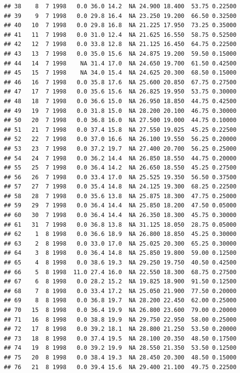 \documentclass[
]{book}
\begin{document}
\begin{verbatim}
## 38    8  7 1998   0.0 36.0 14.2  NA 24.900 18.400  53.75 0.22500
## 39    9  7 1998   0.0 29.8 16.4  NA 23.250 19.200  66.50 0.32500
## 40   10  7 1998   0.0 29.8 16.8  NA 21.225 17.950  73.25 0.35000
## 41   11  7 1998   0.0 31.0 12.4  NA 21.625 16.550  58.75 0.52500
## 42   12  7 1998   0.0 33.8 12.8  NA 21.125 16.450  64.75 0.22500
## 43   13  7 1998   0.0 35.0 15.6  NA 24.875 19.200  59.50 0.15000
## 44   14  7 1998    NA 31.4 17.0  NA 24.650 19.700  61.50 0.42500
## 45   15  7 1998    NA 34.0 15.4  NA 24.625 20.300  68.50 0.15000
## 46   16  7 1998   0.0 35.8 17.6  NA 25.600 20.850  67.75 0.27500
## 47   17  7 1998   0.0 35.6 15.6  NA 26.825 19.950  53.75 0.30000
## 48   18  7 1998   0.0 36.6 15.0  NA 26.950 18.850  44.75 0.42500
## 49   19  7 1998   0.0 31.8 15.0  NA 28.200 20.100  46.75 0.30000
## 50   20  7 1998   0.0 36.8 16.0  NA 27.500 19.000  44.75 0.10000
## 51   21  7 1998   0.0 37.4 15.8  NA 27.550 19.025  45.25 0.22500
## 52   22  7 1998   0.0 37.0 16.6  NA 26.100 19.550  56.25 0.20000
## 53   23  7 1998   0.0 37.2 19.7  NA 27.400 20.700  56.25 0.25000
## 54   24  7 1998   0.0 36.2 14.4  NA 26.850 18.550  44.75 0.20000
## 55   25  7 1998   0.0 36.4 14.2  NA 26.650 18.550  45.25 0.27500
## 56   26  7 1998   0.0 33.4 17.0  NA 25.525 19.350  56.50 0.37500
## 57   27  7 1998   0.0 35.4 14.8  NA 24.125 19.300  68.25 0.22500
## 58   28  7 1998   0.0 35.6 13.8  NA 25.875 18.300  47.75 0.25000
## 59   29  7 1998   0.0 36.4 14.4  NA 25.850 18.200  47.50 0.05000
## 60   30  7 1998   0.0 36.4 14.4  NA 26.350 18.300  45.75 0.30000
## 61   31  7 1998   0.0 36.8 13.8  NA 31.125 18.050  28.75 0.05000
## 62    1  8 1998   0.0 36.6 18.9  NA 26.800 18.850  45.25 0.30000
## 63    2  8 1998   0.0 33.0 17.0  NA 25.025 20.300  65.25 0.30000
## 64    3  8 1998   0.0 36.4 14.8  NA 25.850 19.800  59.00 0.12500
## 65    4  8 1998   0.0 38.6 19.3  NA 29.250 19.750  40.50 0.42500
## 66    5  8 1998  11.0 27.4 16.0  NA 22.550 18.300  68.75 0.27500
## 67    6  8 1998   0.0 28.2 15.2  NA 19.825 18.900  91.50 0.12500
## 68    7  8 1998   0.0 33.4 17.2  NA 25.050 21.900  77.50 0.20000
## 69    8  8 1998   0.0 36.8 19.7  NA 28.200 22.450  62.00 0.25000
## 70   15  8 1998   0.0 36.4 19.9  NA 26.800 23.600  79.00 0.20000
## 71   16  8 1998   0.0 38.8 19.9  NA 29.750 22.950  58.00 0.25000
## 72   17  8 1998   0.0 39.2 18.1  NA 28.800 21.250  53.50 0.20000
## 73   18  8 1998   0.0 37.4 19.5  NA 28.100 20.350  48.50 0.17500
## 74   19  8 1998   0.0 39.2 19.9  NA 28.550 21.350  53.50 0.12500
## 75   20  8 1998   0.0 38.4 19.3  NA 28.450 20.300  48.50 0.15000
## 76   21  8 1998   0.0 39.4 15.6  NA 29.400 21.100  49.75 0.22500

\end{verbatim}
\end{document}
